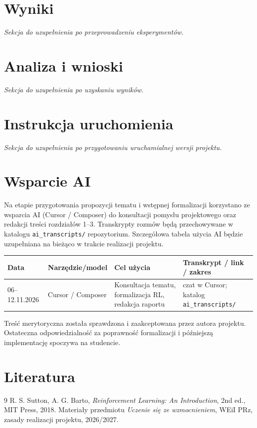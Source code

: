 \documentclass[12pt]{article}
\begin{document}
\section{Wyniki}

\textit{Sekcja do uzupełnienia po przeprowadzeniu eksperymentów.}

\section{Analiza i wnioski}

\textit{Sekcja do uzupełnienia po uzyskaniu wyników.}

\section{Instrukcja uruchomienia}

\textit{Sekcja do uzupełnienia po przygotowaniu uruchamialnej wersji projektu.}

\section{Wsparcie AI}

Na etapie przygotowania propozycji tematu i wstępnej formalizacji korzystano ze wsparcia AI
(Cursor / Composer) do konsultacji pomysłu projektowego oraz redakcji treści rozdziałów 1--3.
Transkrypty rozmów będą przechowywane w katalogu \texttt{ai\_transcripts/} repozytorium.
Szczegółowa tabela użycia AI będzie uzupełniana na bieżąco w trakcie realizacji projektu.

\begin{center}
\begin{tabular}{p{}p{}p{}p{}}
\toprule
Data & Narzędzie/model & Cel użycia & Transkrypt / link / zakres \\
\midrule
06--12.11.2026 & Cursor / Composer & Konsultacja tematu, formalizacja RL, redakcja raportu & czat w Cursor; katalog \texttt{ai\_transcripts/} \\
\bottomrule
\end{tabular}
\end{center}

Treść merytoryczna została sprawdzona i zaakceptowana przez autora projektu.
Ostateczna odpowiedzialność za poprawność formalizacji i późniejszą implementację
spoczywa na studencie.

\section{Literatura}

\begin{thebibliography}{9}
R. S. Sutton, A. G. Barto, \textit{Reinforcement Learning: An Introduction}, 2nd ed., MIT Press, 2018.
Materiały przedmiotu \textit{Uczenie się ze wzmocnieniem}, WEiI PRz, zasady realizacji projektu, 2026/2027.
\end{thebibliography}
\end{document}
